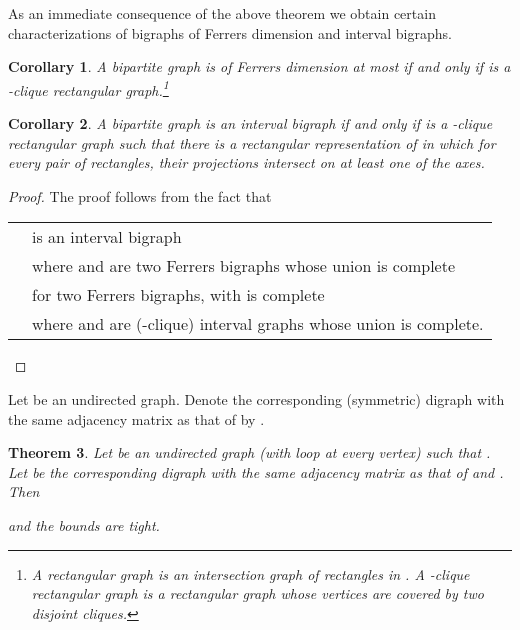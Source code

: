 \documentclass[11pt]{article}
\newtheorem{thm}{Theorem}[section]
\newtheorem{cor}[thm]{Corollary}
\theoremstyle{definition}
\theoremstyle{remark}
\numberwithin{equation}{section}
\begin{document}
As an immediate consequence of the above theorem we obtain certain  characterizations of bigraphs of Ferrers dimension  and interval bigraphs.

\begin{cor}
A bipartite graph  is of Ferrers dimension at most  if and only if  is a -clique rectangular graph.\footnote{A {\em rectangular graph} is an intersection graph of rectangles in . A {\em -clique rectangular graph} is a rectangular graph whose vertices are covered by two disjoint cliques.}
\end{cor}

\begin{cor}
A bipartite graph  is an interval bigraph if and only if  is a -clique rectangular graph such that there is a rectangular representation of  in which for every pair of rectangles, their projections intersect on at least one of the axes. 
\end{cor}

\begin{proof}
The proof follows from the fact that

\vspace{1em} \begin{tabular}{cl}
 &  is an interval bigraph\\
 &  where  and  are two Ferrers bigraphs whose union is complete \cite{M}\\
 &  for two Ferrers bigraphs,  with  is complete\\
 &  where  and  are (-clique) interval graphs whose union is complete.
\end{tabular}

\end{proof}

Let  be an undirected graph. Denote the corresponding (symmetric) digraph with the same adjacency matrix as that of  by .

\begin{thm} \label{thm:beta}
Let  be an undirected graph  (with loop at every vertex) such that . Let  be the corresponding digraph with the same adjacency matrix as that of  and . Then 

and the bounds are tight.
\end{thm}
\end{document}
